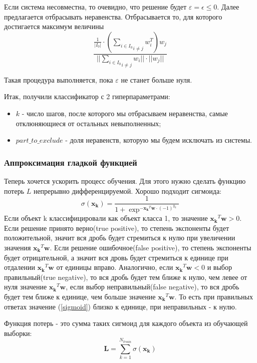 \documentclass[a4paper]{article}
\newcommand{\w}{\bm{w}}
\newcommand{\yk}{y_k}
\newcommand{\xk}{\bm{x_k}}
\begin{document}
Если система несовместна, то очевидно, что решение будет $\varepsilon = \epsilon \le 0$. Далее предлагается отбрасывать неравенства. Отбрасывается то, для которого достигается максимум величины $$\frac{\frac{1}{|I_0|} \cdot (\underset{i \neq j}{\underset{i \in I_0}{\sum}}w_i^T)w_j}{||\underset{i \neq j}{\underset{i \in I_0}{\sum}}w_i||\cdot ||w_j|| }$$

Такая процедура выполняется, пока $\varepsilon$ не станет больше нуля.

Итак, получили классификатор с 2 гиперпараметрами:
\begin{itemize}
\item $k$ - число шагов, после которого мы отбрасываем неравенства, самые отклюняющиеся от остальных невыполненных;
\item $part\_to\_exclude$ - доля неравенств, которую мы будем исключать из системы.
\end{itemize}

\subsubsection{Аппроксимация гладкой функцией}

Теперь хочется ускорить процесс обучения. Для этого нужно сделать функцию потерь $L$ непрерывно дифференцируемой. Хорошо подходит сигмоида:
\begin{equation} \label{sigmoid}
\sigma(\xk) = \frac{1}{1 + \exp^{ - \xk^T\w \cdot (-1)^{\yk}}}
\end{equation}
Если объект k классифицировали как объект класса 1, то значение $\xk^T\w > 0$. Если решение принято верно(true positive), то степень экспоненты будет положительной, значит вся дробь будет стремиться к нулю при увеличении значения $\xk^T\w$. Если решение ошибочное(false positive), то степень экспоненты будет отрицательной, а значит вся дровь будет стремиться к единице при отдалении $\xk^T\w$ от единицы вправо. Аналогично, если $\xk^T\w < 0$ и выбор правильный(true negative), то вся дробь будет тем ближе к нулю, чем левее от нуля значение $\xk^T\w$, если выбор неправильный(false negative), то вся дробь будет тем ближе к единице, чем больше значение $\xk^T\w$. То есть при правильных ответах значение (\ref{sigmoid}) близко к единице, при неправильных - к нулю.

Функция потерь - это сумма таких сигмоид для каждого объекта из обучающей выборки:
\begin{equation}
\bm{L} = \sum_{k = 1}^{N_{train}}\sigma(\xk)
\end{equation}
\end{document}
